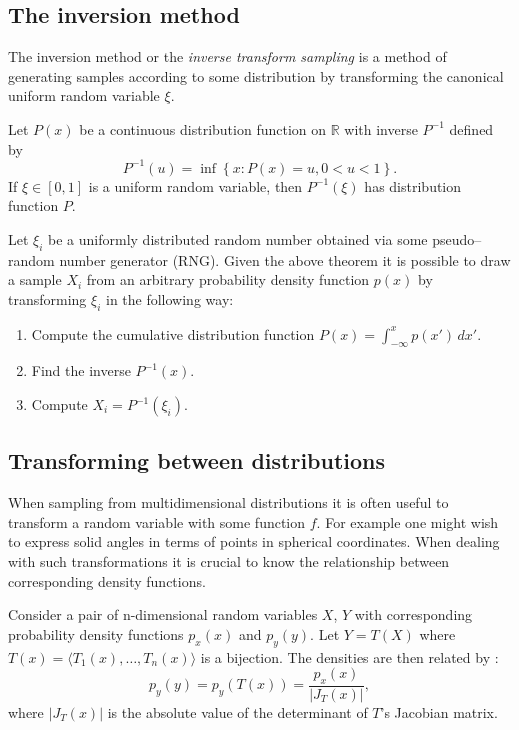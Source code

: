 \subsection{The inversion method}
The inversion method or the \emph{inverse transform sampling} \parencite{devroye86} is a method of generating samples according to some distribution by transforming the canonical uniform random variable $\xi$.
\begin{thm}
  Let $P(x)$ be a continuous distribution function on $\mathbb{R}$ with inverse $P^{-1}$ defined by
  \begin{equation}
    P^{-1}(u) = \inf \left\{ x:P(x)=u, 0 < u < 1 \right\}.
  \end{equation}
If $\xi \in [0,1]$ is a uniform random variable, then $P^{-1}(\xi)$ has distribution function $P$.
\end{thm}

Let $\xi_{i}$ be a uniformly distributed random number obtained via some pseudo--random number generator (RNG). Given the above theorem it is possible to draw a sample $X_{i}$ from an arbitrary probability density function $p(x)$ by transforming $\xi_{i}$ in the following way:
\begin{enumerate}
\item Compute the cumulative distribution function $P(x) = \int_{-\infty}^{x} p(x') \,dx'$.
\item Find the inverse $P^{-1}(x)$.
\item Compute $X_{i} = P^{-1}(\xi_{i})$.
\end{enumerate}

\subsection{Transforming between distributions}
When sampling from multidimensional distributions it is often useful to transform a random variable with some function $f$. For example one might wish to express solid angles in terms of points in spherical coordinates. When dealing with such transformations it is crucial to know the relationship between corresponding density functions.

Consider a pair of n-dimensional random variables $X$, $Y$ with corresponding probability density functions $p_{x}(x)$ and $p_{y}(y)$. Let $Y = T(X)$ where $T(x)=\langle T_{1}(x), \dots, T_{n}(x) \rangle$ is a bijection. The densities are then related by \parencite{phar2010}:
\begin{equation}
\label{eq:pdf_transform}
  p_{y}(y)=p_{y}(T(x)) = \frac{p_{x}(x)}{|J_{T}(x)|},
\end{equation}
where $|J_{T}(x)|$ is the absolute value of the determinant of $T$'s Jacobian matrix.

